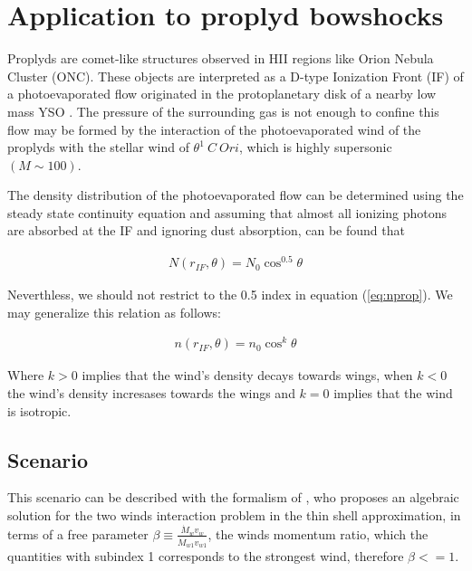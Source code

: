 \section{Application to proplyd bowshocks}
\label{sec:application}

\newcommand\CRW{\citetalias{Canto:1996}}

Proplyds are comet-like structures observed in HII regions like Orion Nebula Cluster (ONC). 
These objects are interpreted as a D-type Ionization Front (IF) of a photoevaporated flow 
originated in the protoplanetary disk of a nearby low mass YSO \citep{Johnstone:1998}.
The pressure of the surrounding gas is not enough to confine this flow \citep{HA:1998}
may be formed by the interaction of the photoevaporated wind of the proplyds with the stellar wind of $\theta^1~C~Ori$, which is highly supersonic $(M \sim 100)$. 

The density distribution of the photoevaporated flow can be determined using the steady state continuity equation and assuming that almost all ionizing photons are absorbed at the IF \citep{HA:1998} and ignoring dust absorption, can be found that

\begin{align}
N(r_{IF},\theta) = N_0 \cos^{0.5}\theta
\label{eq:nprop}
\end{align}

Neverthless, we should not restrict to the 0.5 index in equation (\ref{eq:nprop}). We may generalize this relation as follows:

\begin{align}
n(r_{IF},\theta) = n_0 \cos^{k}\theta
\label{eq:ngen}
\end{align}

Where $k >0$ implies that the wind's density decays towards wings, when $k<0$ the wind's density incresases towards the wings and $k=0$ implies that the wind is isotropic.

\subsection{\CRW{} Scenario}
This scenario can be described with the formalism of
\citet[][hereafter \CRW{}]{Canto:1996}, who proposes an algebraic
solution for the two winds interaction problem in the thin shell
approximation, in terms of a free parameter
$\beta\equiv\frac{\dot{M}_wv_w}{\dot{M}_{w1}v_{w1}}$, the winds
momentum ratio, which the quantities with subindex 1 corresponds to
the strongest wind, therefore $\beta<=1$.

